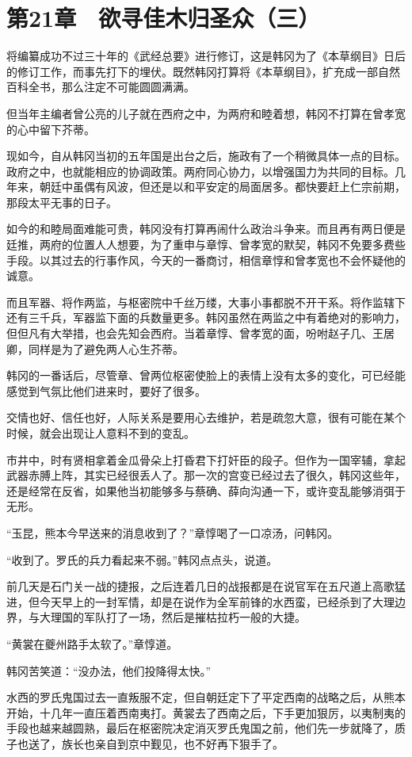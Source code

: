 \section{第21章　欲寻佳木归圣众（三）}

将编纂成功不过三十年的《武经总要》进行修订，这是韩冈为了《本草纲目》日后的修订工作，而事先打下的埋伏。既然韩冈打算将《本草纲目》，扩充成一部自然百科全书，那么注定不可能圆圆满满。

但当年主编者曾公亮的儿子就在西府之中，为两府和睦着想，韩冈不打算在曾孝宽的心中留下芥蒂。

现如今，自从韩冈当初的五年国是出台之后，施政有了一个稍微具体一点的目标。政府之中，也就能相应的协调政策。两府同心协力，以增强国力为共同的目标。几年来，朝廷中虽偶有风波，但还是以和平安定的局面居多。都快要赶上仁宗前期，那段太平无事的日子。

如今的和睦局面难能可贵，韩冈没有打算再闹什么政治斗争来。而且再有两日便是廷推，两府的位置人人想要，为了重申与章惇、曾孝宽的默契，韩冈不免要多费些手段。以其过去的行事作风，今天的一番商讨，相信章惇和曾孝宽也不会怀疑他的诚意。

而且军器、将作两监，与枢密院中千丝万缕，大事小事都脱不开干系。将作监辖下还有三千兵，军器监下面的兵数量更多。韩冈虽然在两监之中有着绝对的影响力，但但凡有大举措，也会先知会西府。当着章惇、曾孝宽的面，吩咐赵子几、王居卿，同样是为了避免两人心生芥蒂。

韩冈的一番话后，尽管章、曾两位枢密使脸上的表情上没有太多的变化，可已经能感觉到气氛比他们进来时，要好了很多。

交情也好、信任也好，人际关系是要用心去维护，若是疏忽大意，很有可能在某个时候，就会出现让人意料不到的变乱。

市井中，时有贤相拿着金瓜骨朵上打昏君下打奸臣的段子。但作为一国宰辅，拿起武器赤膊上阵，其实已经很丢人了。那一次的宫变已经过去了很久，韩冈这些年，还是经常在反省，如果他当初能够多与蔡确、薛向沟通一下，或许变乱能够消弭于无形。

“玉昆，熊本今早送来的消息收到了？”章惇喝了一口凉汤，问韩冈。

“收到了。罗氏的兵力看起来不弱。”韩冈点点头，说道。

前几天是石门关一战的捷报，之后连着几日的战报都是在说官军在五尺道上高歌猛进，但今天早上的一封军情，却是在说作为全军前锋的水西蛮，已经杀到了大理边界，与大理国的军队打了一场，然后是摧枯拉朽一般的大捷。

“黄裳在夔州路手太软了。”章惇道。

韩冈苦笑道：“没办法，他们投降得太快。”

水西的罗氏鬼国过去一直叛服不定，但自朝廷定下了平定西南的战略之后，从熊本开始，十几年一直压着西南夷打。黄裳去了西南之后，下手更加狠厉，以夷制夷的手段也越来越圆熟，最后在枢密院决定消灭罗氏鬼国之前，他们先一步就降了，质子也送了，族长也亲自到京中觐见，也不好再下狠手了。

